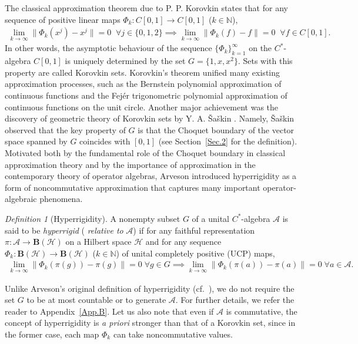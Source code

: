 \documentclass[reqno]{amsproc}
\numberwithin{equation}{section}
\theoremstyle{remark}
\newtheorem{df}[theorem]{Definition}
\newcommand*{\ascr}{\mathscr{A}}
\newcommand*{\hh}{\mathcal{H}}
\newcommand*{\natu}{\mathbb{N}}
\theoremstyle{definition}
\newcommand*{\ogr}{\boldsymbol{B}}
\begin{document}
The classical approximation theorem due to P. P.
Korovkin \cite{Kor53} states that for any sequence of
positive linear maps $\varPhi_k\colon C[0,1]\to
C[0,1]$ ($k\in \natu$),
   \begin{align*}
\lim_{k\to\infty}\|\varPhi_k(x^j)-x^j\|=0 \;\; \forall
j\in \{0,1,2\} \implies
\lim_{k\to\infty}\|\varPhi_k(f)-f\|=0 \;\; \forall
f\in C[0,1].
   \end{align*}
In other words, the asymptotic behaviour of the
sequence $\{\varPhi_k\}_{k=1}^\infty$ on the
$C^*$-algebra $C[0, 1]$ is uniquely determined by the
set $G=\{1, x, x^2\}$. Sets with this property are
called Korovkin sets. Korovkin's theorem unified many
existing approximation processes, such as the
Bernstein polynomial approximation of continuous
functions and the Fej\'{e}r trigonometric polynomial
approximation of continuous functions on the unit
circle. Another major achievement was the discovery of
geometric theory of Korovkin sets by Y. A.
\v{S}a\v{s}kin \cite{Sas67}. Namely, \v{S}a\v{s}kin
observed that the key property of $G$ is that the
Choquet boundary of the vector space spanned by $G$
coincides with $[0, 1]$ (see Section~\ref{Sec.2} for
the definition). Motivated both by the fundamental
role of the Choquet boundary in classical
approximation theory and by the importance of
approximation in the contemporary theory of operator
algebras, Arveson introduced hyperrigidity as a form
of noncommutative approximation that captures many
important operator-algebraic phenomena.
   \begin{df}[Hyperrigidity] \label{dyfnh}
A nonempty subset $ G$ of a unital $C^*$-algebra
$\ascr$ is said to be \textit{hyperrigid} ({\em
relative to} $\ascr$\/) if for any faithful
representation $\pi\colon \ascr\to \ogr(\hh)$ on a
Hilbert space $\hh$ and for any sequence
$\varPhi_k\colon \ogr(\hh)\to \ogr(\hh)$ ($k\in
\natu$) of unital completely positive (UCP) maps,
   \begin{align*}
\lim_{k\to\infty}\|\varPhi_k(\pi(g))-\pi(g)\|=0
\; \forall g\in G \implies
\lim_{k\to\infty}\|\varPhi_k(\pi(a))-\pi(a)\|=0
\; \forall a\in \ascr.
   \end{align*}
   \end{df}
Unlike Arveson's original definition of hyperrigidity
(cf.\ {\cite[Definition~1.1]{Arv11}}), we do not
require the set $G$ to be at most countable or to
generate $\ascr$. For further details, we refer the
reader to Appendix~\ref{App.B}. Let us also note that
even if $\ascr$ is commutative, the concept of
hyperrigidity is {\em a priori} stronger than that of
a Korovkin set, since in the former case, each map
$\varPhi_k$ can take noncommutative values.
\end{document}
